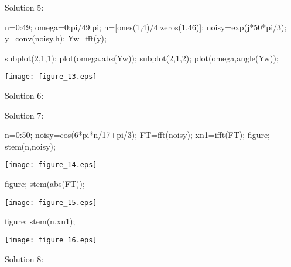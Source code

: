 \documentclass[12pt, onecolumn]{IEEEtran}
\begin{document}
\begin{par}
\begin{flushleft}
Solution 5:
\end{flushleft}
\end{par}

\begin{matlabcode}
n=0:49;
omega=0:pi/49:pi;
h=[ones(1,4)/4  zeros(1,46)];
noisy=exp(j*50*pi/3);
y=conv(noisy,h);
Yw=fft(y);

subplot(2,1,1);
plot(omega,abs(Yw));
subplot(2,1,2);
plot(omega,angle(Yw));
\end{matlabcode}
\begin{center}
\texttt{[image: figure\_13.eps]}
\end{center}

\begin{par}
\begin{flushleft}
Solution 6:
\end{flushleft}
\end{par}

\begin{matlabcode}
\end{matlabcode}

\begin{par}
\begin{flushleft}
Solution 7:
\end{flushleft}
\end{par}

\begin{matlabcode}
n=0:50; 
noisy=cos(6*pi*n/17+pi/3); 
FT=fft(noisy);
xn1=ifft(FT); 
figure; 
stem(n,noisy); 
\end{matlabcode}
\begin{center}
\texttt{[image: figure\_14.eps]}
\end{center}
\begin{matlabcode}
figure; 
stem(abs(FT));
\end{matlabcode}
\begin{center}
\texttt{[image: figure\_15.eps]}
\end{center}
\begin{matlabcode}
figure; 
stem(n,xn1); 
\end{matlabcode}
\begin{center}
\texttt{[image: figure\_16.eps]}
\end{center}

\begin{par}
\begin{flushleft}
Solution 8:
\end{flushleft}
\end{par}
\end{document}
